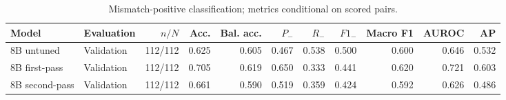 \begin{table}[htbp]
\centering
\caption{Mismatch-positive classification; metrics conditional on scored pairs.}
\label{tab:statements-metrics}
\small
\begin{adjustbox}{max width=\textwidth}
\begin{tabular}{llrrrrrrrrr}
\toprule
Model & Evaluation & $n/N$ & Acc. & Bal. acc. & $P_-$ & $R_-$ & $F1_-$ & Macro F1 & AUROC & AP \\
\midrule
8B untuned & Validation & 112/112 & 0.625 & 0.605 & 0.467 & 0.538 & 0.500 & 0.600 & 0.646 & 0.532 \\
8B first-pass & Validation & 112/112 & 0.705 & 0.619 & 0.650 & 0.333 & 0.441 & 0.620 & 0.721 & 0.603 \\
8B second-pass & Validation & 112/112 & 0.661 & 0.590 & 0.519 & 0.359 & 0.424 & 0.592 & 0.626 & 0.486 \\
\bottomrule
\end{tabular}
\end{adjustbox}
\end{table}
